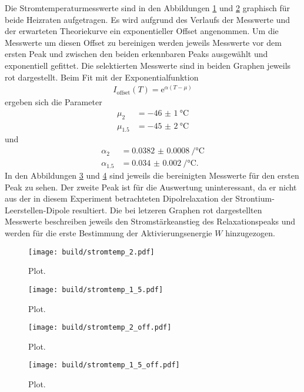 Die Stromtemperaturmesswerte sind in den Abbildungen \ref{fig:messwerte2} und
\ref{fig:messwerte15} graphisch für beide Heizraten aufgetragen. Es wird
aufgrund des Verlaufs der Messwerte und der erwarteten Theoriekurve ein
exponentieller Offset angenommen. Um die Messwerte um diesen Offset zu bereinigen
werden jeweils Messwerte vor dem ersten Peak und zwischen den beiden erkennbaren
Peaks ausgewählt und exponentiell gefittet. Die selektierten Messwerte sind in beiden
Graphen jeweils rot dargestellt. Beim Fit mit der Exponentialfunktion
\begin{align}
  I_\text{offset}(T) = \mathrm{e}^{\alpha(T-\mu)}
\end{align}
ergeben sich die Parameter
\begin{align}
  \mu_{2} &= \SI{-46(1)}{\celsius} \\
  \mu_{1.5} &= \SI{-45(2)}{\celsius}
\end{align}
und
\begin{align}
  \alpha_{2} &= \SI{0.0382(8)}{\per\celsius} \\
  \alpha_{1.5} &= \SI{0.034(2)}{\per\celsius}.
\end{align}
In den Abbildungen \ref{fig:messwerte2off} und \ref{fig:messwerte15off} sind
jeweils die bereinigten Messwerte für den ersten Peak zu sehen. Der zweite Peak ist
für die Auswertung uninteressant, da er nicht aus der in diesem Experiment
betrachteten Dipolrelaxation der Strontium-Leerstellen-Dipole resultiert.
Die bei letzeren Graphen rot dargestellten Messwerte beschreiben jeweils den
Stromstärkeanstieg des Relaxationspeaks und werden für die erste Bestimmung der
Aktivierungsenergie $W$ hinzugezogen.

\begin{figure}
  \centering
  \texttt{[image: build/stromtemp\_2.pdf]}
  \caption{Plot.}
  \label{fig:messwerte2}
\end{figure}

\begin{figure}
  \centering
  \texttt{[image: build/stromtemp\_1\_5.pdf]}
  \caption{Plot.}
  \label{fig:messwerte15}
\end{figure}

\begin{figure}
  \centering
  \texttt{[image: build/stromtemp\_2\_off.pdf]}
  \caption{Plot.}
  \label{fig:messwerte2off}
\end{figure}

\begin{figure}
  \centering
  \texttt{[image: build/stromtemp\_1\_5\_off.pdf]}
  \caption{Plot.}
  \label{fig:messwerte15off}
\end{figure}

